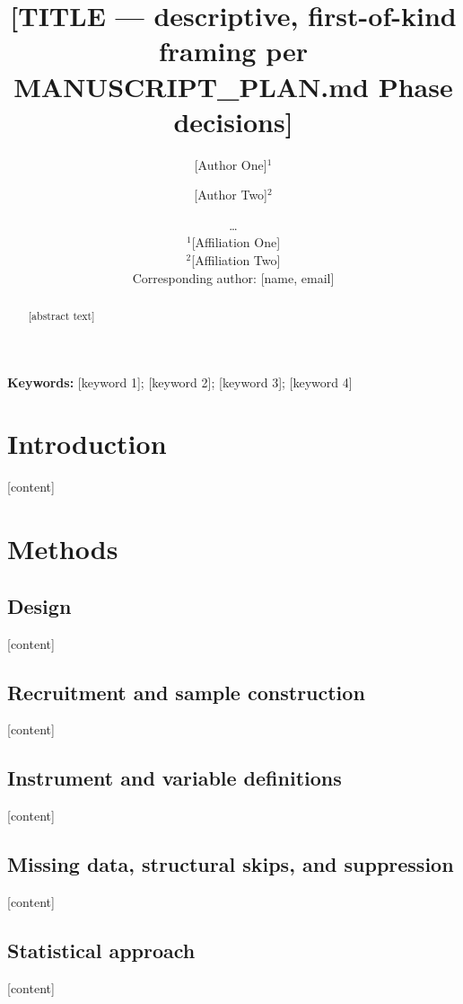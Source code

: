 \documentclass[12pt]{article}
\title{[TITLE — descriptive, first-of-kind framing per MANUSCRIPT_PLAN.md Phase decisions]}
\author{
  [Author One]$^{1}$ \and [Author Two]$^{2}$ \and \ldots \\
  \small $^{1}$[Affiliation One] \\
  \small $^{2}$[Affiliation Two] \\
  \small Corresponding author: [name, email] %
}
\date{}
\begin{document}
\maketitle
\linenumbers

\begin{abstract}
\noindent
[abstract text]
\end{abstract}

\noindent\textbf{Keywords:} [keyword 1]; [keyword 2]; [keyword 3]; [keyword 4] %

\section{Introduction}
[content]

\section{Methods}
\subsection{Design}
[content]
\subsection{Recruitment and sample construction}
[content]
\subsection{Instrument and variable definitions}
[content]
\subsection{Missing data, structural skips, and suppression}
[content]
\subsection{Statistical approach}
[content]
\end{document}
